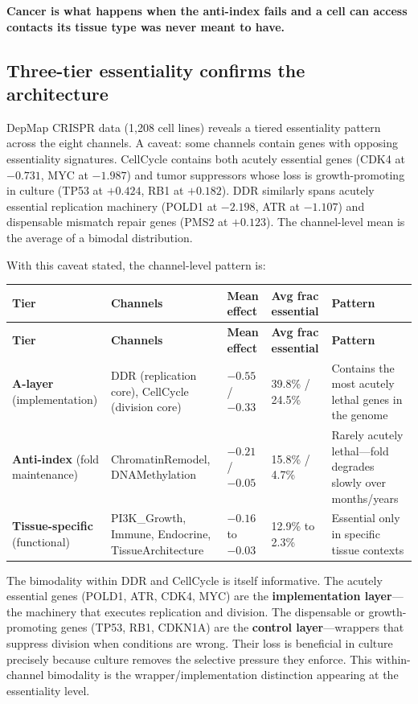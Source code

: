 \documentclass[11pt]{article}
\theoremstyle{definition}
\begin{document}
\textbf{Cancer is what happens when the anti-index fails and a cell can access contacts its tissue type was never meant to have.}

\subsection{Three-tier essentiality confirms the architecture}

DepMap CRISPR data (1,208 cell lines) reveals a tiered essentiality pattern across the eight channels. A caveat: some channels contain genes with opposing essentiality signatures. CellCycle contains both acutely essential genes (CDK4 at $-0.731$, MYC at $-1.987$) and tumor suppressors whose loss is growth-promoting in culture (TP53 at $+0.424$, RB1 at $+0.182$). DDR similarly spans acutely essential replication machinery (POLD1 at $-2.198$, ATR at $-1.107$) and dispensable mismatch repair genes (PMS2 at $+0.123$). The channel-level mean is the average of a bimodal distribution.

With this caveat stated, the channel-level pattern is:

\begin{longtable}{p{2.8cm} p{3.5cm} p{1.8cm} p{2.2cm} p{3.5cm}}
\toprule
\textbf{Tier} & \textbf{Channels} & \textbf{Mean effect} & \textbf{Avg frac essential} & \textbf{Pattern} \\
\midrule
\endfirsthead
\toprule
\textbf{Tier} & \textbf{Channels} & \textbf{Mean effect} & \textbf{Avg frac essential} & \textbf{Pattern} \\
\midrule
\endhead
\textbf{A-layer} (implementation) & DDR (replication core), CellCycle (division core) & $-0.55$ / $-0.33$ & 39.8\% / 24.5\% & Contains the most acutely lethal genes in the genome \\
\midrule
\textbf{Anti-index} (fold maintenance) & ChromatinRemodel, DNAMethylation & $-0.21$ / $-0.05$ & 15.8\% / 4.7\% & Rarely acutely lethal---fold degrades slowly over months/years \\
\midrule
\textbf{Tissue-specific} (functional) & PI3K\_Growth, Immune, Endocrine, TissueArchitecture & $-0.16$ to $-0.03$ & 12.9\% to 2.3\% & Essential only in specific tissue contexts \\
\bottomrule
\end{longtable}

The bimodality within DDR and CellCycle is itself informative. The acutely essential genes (POLD1, ATR, CDK4, MYC) are the \textbf{implementation layer}---the machinery that executes replication and division. The dispensable or growth-promoting genes (TP53, RB1, CDKN1A) are the \textbf{control layer}---wrappers that suppress division when conditions are wrong. Their loss is beneficial in culture precisely because culture removes the selective pressure they enforce. This within-channel bimodality is the wrapper/implementation distinction appearing at the essentiality level.
\end{document}
